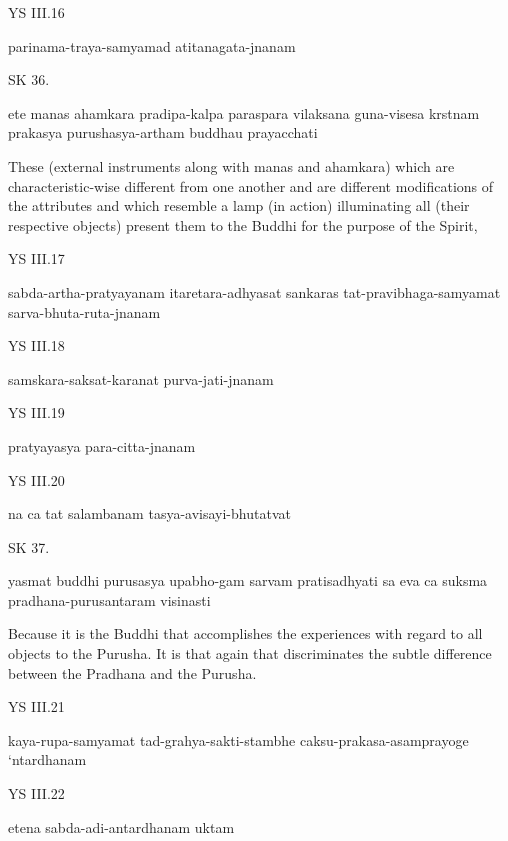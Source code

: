 YS III.16

    parinama-traya-samyamad atitanagata-jnanam

SK 36.

ete manas ahamkara pradipa-kalpa paraspara vilaksana
guna-visesa krstnam prakasya purushasya-artham buddhau prayacchati

These (external instruments along with manas and ahamkara)
which are characteristic-wise different from one another
and are different modifications of the attributes
and which resemble a lamp (in action) illuminating all (their respective objects)
present them to the Buddhi for the purpose of the Spirit,

YS III.17

    sabda-artha-pratyayanam itaretara-adhyasat sankaras tat-pravibhaga-samyamat sarva-bhuta-ruta-jnanam

YS III.18

    samskara-saksat-karanat purva-jati-jnanam

YS III.19

    pratyayasya para-citta-jnanam

YS III.20

    na ca tat salambanam tasya-avisayi-bhutatvat

SK 37.

yasmat buddhi purusasya upabho-gam sarvam pratisadhyati
sa eva ca suksma pradhana-purusantaram visinasti

Because it is the Buddhi that accomplishes the experiences
with regard to all objects to the Purusha.
It is that again that discriminates the subtle difference
between the Pradhana and the Purusha.

YS III.21

    kaya-rupa-samyamat tad-grahya-sakti-stambhe caksu-prakasa-asamprayoge ‘ntardhanam

YS III.22

    etena sabda-adi-antardhanam uktam

    